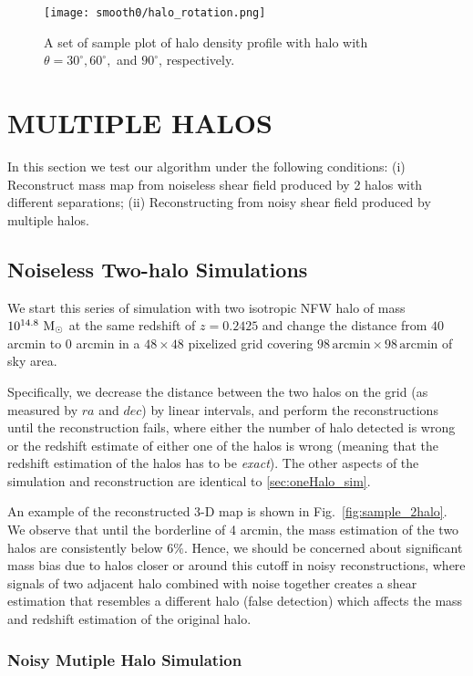 \documentclass[twocolumn, usenames, dvipsnames]{aastex63}
\begin{document}
\begin{figure*}[!ht]
\centering
\texttt{[image: smooth0/halo\_rotation.png]}
\caption{
    A set of sample plot of halo density profile with halo with
    $\theta=30^\circ, 60^\circ,$ and $90^\circ$, respectively.
    \label{halo_rotation}
}
\end{figure*}

\section{MULTIPLE HALOS}
\label{sec:twohalos}

In this section we test our algorithm under the following conditions: (i)
Reconstruct mass map from noiseless shear field produced by 2 halos with
different separations; (ii) Reconstructing from noisy shear field produced by
multiple halos.

\subsection{Noiseless Two-halo Simulations}
\label{sec:noiseless 2 halo}
We start this series of simulation with two isotropic NFW halo of mass
$10^{14.8}~\textup{M}_\odot$ at the same redshift of $z=0.2425$ and change the
distance from $40$ arcmin to $0$ arcmin in a $48 \times 48$ pixelized grid
covering $98 \,\text{arcmin} \times 98\, \text{arcmin}$ of sky area.

Specifically, we decrease the distance between the two halos on the grid (as
measured by $ra$ and $dec$) by linear intervals, and perform the
reconstructions until the reconstruction fails, where either the number of halo
detected is wrong or the redshift estimate of either one of the halos is wrong
(meaning that the redshift estimation of the halos has to be \textit{exact}).
The other aspects of the simulation and reconstruction are identical to
\ref{sec:oneHalo_sim}.

An example of the reconstructed 3-D map is shown in
Fig.~\ref{fig:sample_2halo}. We observe that until the borderline of 4 arcmin,
the mass estimation of the two halos are consistently below $6\%$. Hence, we
should be concerned about significant mass bias due to halos closer or around
this cutoff in noisy reconstructions, where signals of two adjacent halo
combined with noise together creates a shear estimation that resembles a
different halo (false detection) which affects the mass and redshift estimation
of the original halo.

\subsubsection{Noisy Mutiple Halo Simulation}
\label{sec:noisy_multi_halo}
\end{document}
